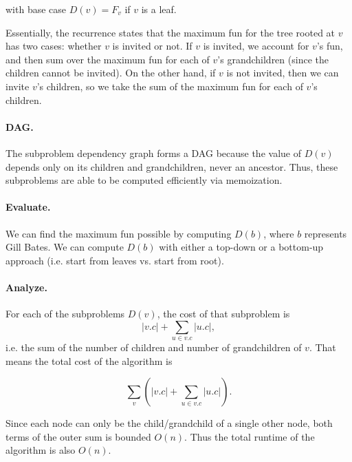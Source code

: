 \documentclass{6046}
\begin{document}
with base case $D(v) = F_v$ if $v$ is a leaf.

Essentially, the recurrence states that the maximum fun
for the tree rooted at $v$ has two cases: whether $v$
is invited or not. If $v$ is invited, we account for $v$'s
fun, and then sum over the maximum fun for each of $v$'s
grandchildren (since the children cannot be invited).
On the other hand, if $v$ is not invited, then we can
invite $v$'s children, so we take the sum of the
maximum fun for each of $v$'s children.

\vspace{-1em}
\paragraph{DAG.}
The subproblem dependency graph forms a DAG because the value
of $D(v)$ depends only on its children and grandchildren,
never an ancestor. Thus, these subproblems are able to be
computed efficiently via memoization.

\vspace{-1em}
\paragraph{Evaluate.}
We can find the maximum fun possible by computing $D(b)$, where
$b$ represents Gill Bates. We can compute $D(b)$ with
either a top-down or a bottom-up approach (i.e. start from
leaves vs. start from root).

\vspace{-1em}
\paragraph{Analyze.}
For each of the subproblems $D(v)$, the cost of that subproblem
is
$$|v.c| + \sum_{u \in v.c} |u.c|,$$
i.e. the sum of the number of children and number
of grandchildren of $v$.
That means the total cost of the algorithm is

$$\sum_v(|v.c| + \sum_{u \in v.c} |u.c|).$$

Since each node can only be the child/grandchild
of a single other node, both terms of the outer
sum is bounded $O(n)$. Thus the total runtime of the
algorithm is also $O(n)$.
\end{document}
